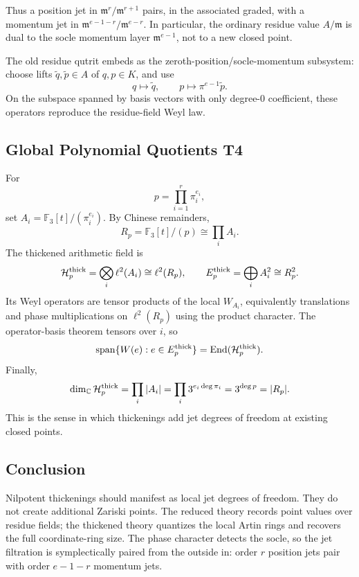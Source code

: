Thus a position jet in \(\mathfrak m^r/\mathfrak m^{r+1}\) pairs, in the
associated graded, with a momentum jet in
\(\mathfrak m^{e-1-r}/\mathfrak m^{e-r}\).  In particular, the ordinary
residue value \(A/\mathfrak m\) is dual to the socle momentum layer
\(\mathfrak m^{e-1}\), not to a new closed point.

The old residue qutrit embeds as the zeroth-position/socle-momentum subsystem:
choose lifts \(\tilde q,\tilde p\in A\) of \(q,p\in K\), and use
\[
  q\longmapsto \tilde q,\qquad p\longmapsto \pi^{e-1}\tilde p.
\]
On the subspace spanned by basis vectors with only degree-\(0\) coefficient,
these operators reproduce the residue-field Weyl law.

\subsection{Global Polynomial Quotients T4}

For
\[
  p=\prod_{i=1}^r\pi_i^{e_i},
\]
set \(A_i=\mathbb F_3[t]/(\pi_i^{e_i})\).  By Chinese remainders,
\[
  R_p=\mathbb F_3[t]/(p)\cong\prod_iA_i.
\]
The thickened arithmetic field is
\[
  \mathcal H_p^{\rm thick}
  =
  \bigotimes_i\ell^2(A_i)
  \cong \ell^2(R_p),
\qquad
  E_p^{\rm thick}=\bigoplus_i A_i^2\cong R_p^2.
\]
Its Weyl operators are tensor products of the local \(W_{A_i}\), equivalently
translations and phase multiplications on \(\ell^2(R_p)\) using the product
character.  The operator-basis theorem tensors over \(i\), so
\[
  \operatorname{span}\{W(e):e\in E_p^{\rm thick}\}
  =
  \operatorname{End}(\mathcal H_p^{\rm thick}).
\]
Finally,
\[
  \dim_\mathbb C\mathcal H_p^{\rm thick}
  =
  \prod_i |A_i|
  =
  \prod_i 3^{e_i\deg\pi_i}
  =
  3^{\deg p}
  =
  |R_p|.
\]
This is the sense in which thickenings add jet degrees of freedom at existing
closed points.

\subsection{Conclusion}

Nilpotent thickenings should manifest as local jet degrees of freedom.  They
do not create additional Zariski points.  The reduced theory records point
values over residue fields; the thickened theory quantizes the local Artin
rings and recovers the full coordinate-ring size.  The phase character detects
the socle, so the jet filtration is symplectically paired from the outside in:
order \(r\) position jets pair with order \(e-1-r\) momentum jets.
